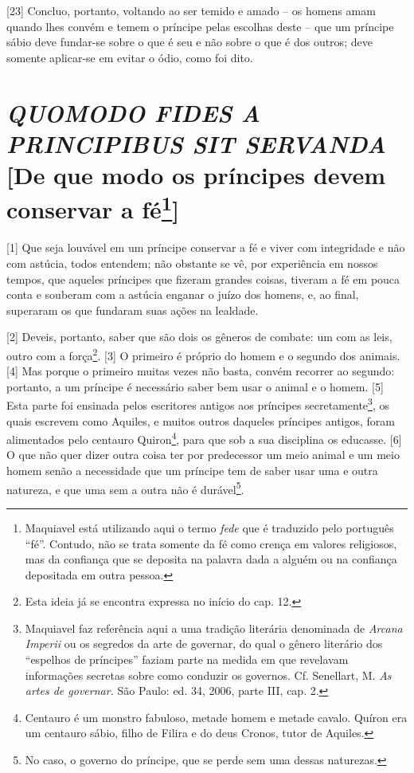 {[}23{]} Concluo, portanto, voltando ao ser temido e amado -- os homens
amam quando lhes convém e temem o príncipe pelas escolhas deste -- que
um príncipe sábio deve fundar-se sobre o que é seu e não sobre o que é
dos outros; deve somente aplicar-se em evitar o ódio, como foi dito.

\quebra\section{\emph{QUOMODO FIDES A PRINCIPIBUS SIT SERVANDA}
{[}De que modo os príncipes devem conservar a fé\protect\footnote{Maquiavel está
  utilizando aqui o termo \emph{fede} que é traduzido pelo português
  ``fé''. Contudo, não se trata somente da fé como crença em valores
  religiosos, mas da confiança que se deposita na palavra dada a alguém
  ou na confiança depositada em outra pessoa.}{]}}

{[}1{]} Que seja louvável em um príncipe conservar a fé e viver com
integridade e não com astúcia, todos entendem; não obstante se vê, por
experiência em nossos tempos, que aqueles príncipes que fizeram grandes
coisas, tiveram a fé em pouca conta e souberam com a astúcia enganar o
juízo dos homens, e, ao final, superaram os que fundaram suas ações na
lealdade.

{[}2{]} Deveis, portanto, saber que são dois os gêneros de combate: um
com as leis, outro com a força\footnote{Esta ideia já se encontra
  expressa no início do cap. 12.}. {[}3{]} O primeiro é próprio do homem
e o segundo dos animais. {[}4{]} Mas porque o primeiro muitas vezes não
basta, convém recorrer ao segundo: portanto, a um príncipe é necessário
saber bem usar o animal e o homem. {[}5{]} Esta parte foi ensinada pelos
escritores antigos aos príncipes secretamente\footnote{Maquiavel faz
  referência aqui a uma tradição literária denominada de \emph{Arcana
  Imperii} ou os segredos da arte de governar, do qual o gênero
  literário dos ``espelhos de príncipes'' faziam parte na medida em que
  revelavam informações secretas sobre como conduzir os governos. Cf.
  Senellart, M. \emph{As artes de governar.} São Paulo: ed. 34, 2006,
  parte III, cap. 2.}, os quais escrevem como Aquiles, e muitos outros
daqueles príncipes antigos, foram alimentados pelo centauro
Quiron\footnote{Centauro é um monstro fabuloso, metade homem e metade
  cavalo. Quíron era um centauro sábio, filho de Filira e do deus
  Cronos, tutor de Aquiles.}, para que sob a sua disciplina os educasse.
{[}6{]} O que não quer dizer outra coisa ter por predecessor um meio
animal e um meio homem senão a necessidade que um príncipe tem de saber
usar uma e outra natureza, e que uma sem a outra não é durável\footnote{No
  caso, o governo do príncipe, que se perde sem uma dessas naturezas.}.

